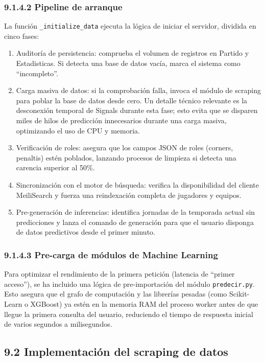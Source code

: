\subsubsection{9.1.4.2 Pipeline de arranque}
 
La función \texttt{\_initialize\_data} ejecuta la lógica de iniciar el servidor, dividida en cinco fases:
 
\begin{enumerate}
\item Auditoría de persistencia: comprueba el volumen de registros en Partido y Estadisticas. Si detecta una base de datos vacía, marca el sistema como ``incompleto''.
\item Carga masiva de datos: si la comprobación falla, invoca el módulo de scraping para poblar la base de datos desde cero. Un detalle técnico relevante es la desconexión temporal
de Signals durante esta fase; esto evita que se disparen miles de hilos de predicción innecesarios durante una carga masiva, optimizando el uso de CPU y memoria.
\item Verificación de roles: asegura que los campos JSON de roles (corners, penaltis) estén poblados, lanzando procesos de limpieza si detecta una carencia superior al 50\%.
\item Sincronización con el motor de búsqueda: verifica la disponibilidad del cliente MeiliSearch y fuerza una reindexación completa de jugadores y equipos.
\item Pre-generación de inferencias: identifica jornadas de la temporada actual sin predicciones y lanza el comando de generación para que el usuario disponga de datos predictivos desde el primer minuto.
\end{enumerate}
 
\subsubsection{9.1.4.3 Pre-carga de módulos de Machine Learning}
 
Para optimizar el rendimiento de la primera petición (latencia de ``primer acceso''), se ha incluido una lógica de pre-importación del módulo \texttt{predecir.py}.
Esto asegura que el grafo de computación y las librerías pesadas (como Scikit-Learn o XGBoost) ya estén en la memoria RAM del proceso worker antes de que llegue la
primera consulta del usuario, reduciendo el tiempo de respuesta inicial de varios segundos a milisegundos.
 
\subsection{9.2 Implementación del scraping de datos}
 
